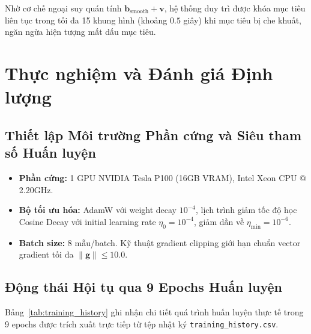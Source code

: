 \documentclass[11pt,a4paper]{article}
\begin{document}
Nhờ cơ chế ngoại suy quán tính $\mathbf{b}_{\text{smooth}} + \mathbf{v}$, hệ thống duy trì được khóa mục tiêu liên tục trong tối đa 15 khung hình (khoảng $0.5$ giây) khi mục tiêu bị che khuất, ngăn ngừa hiện tượng mất dấu mục tiêu.

\section{Thực nghiệm và Đánh giá Định lượng}


\subsection{Thiết lập Môi trường Phần cứng và Siêu tham số Huấn luyện}
\begin{itemize}
    \item \textbf{Phần cứng:} 1 GPU NVIDIA Tesla P100 (16GB VRAM), Intel Xeon CPU @ 2.20GHz.
    \item \textbf{Bộ tối ưu hóa:} AdamW với weight decay $10^{-4}$, lịch trình giảm tốc độ học Cosine Decay với initial learning rate $\eta_0 = 10^{-4}$, giảm dần về $\eta_{\min} = 10^{-6}$.
    \item \textbf{Batch size:} 8 mẫu/batch. Kỹ thuật gradient clipping giới hạn chuẩn vector gradient tối đa $\|\mathbf{g}\| \le 10.0$.
\end{itemize}

\subsection{Động thái Hội tụ qua 9 Epochs Huấn luyện}
Bảng~\ref{tab:training_history} ghi nhận chi tiết quá trình huấn luyện thực tế trong 9 epochs được trích xuất trực tiếp từ tệp nhật ký {\texttt{training\_history.csv}}.
\end{document}
